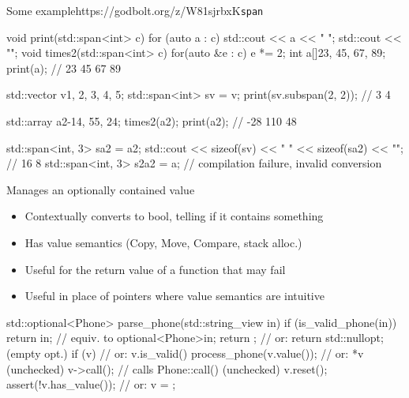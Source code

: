 \begin{frame}[fragile]
  \begin{exampleblockGB}{Some example}{https://godbolt.org/z/W81sjrbxK}{\texttt{span}}
    \scriptsize
    \begin{cppcode*}{}
      void print(std::span<int> c) {
        for (auto a : c) { std::cout << a << " "; }
        std::cout << "\n";
      }
      void times2(std::span<int> c) {
        for(auto &e : c) { e *= 2; }
      }
      int a[]{23, 45, 67, 89};
      print(a);                 // 23 45 67 89

      std::vector v{1, 2, 3, 4, 5};
      std::span<int> sv = v;
      print(sv.subspan(2, 2));  // 3 4

      std::array a2{-14, 55, 24};
      times2(a2);
      print(a2);                // -28 110 48

      std::span<int, 3> sa2 = a2;
      std::cout << sizeof(sv) << " " << sizeof(sa2) << "\n";  // 16 8
      std::span<int, 3> s2a2 = a; // compilation failure, invalid conversion
    \end{cppcode*}
  \end{exampleblockGB}
\end{frame}

\begin{frame}[fragile]
  \begin{block}{Manages an optionally contained value}
    \begin{itemize}
    \item Contextually converts to bool, telling if it contains something
    \item Has value semantics (Copy, Move, Compare, stack alloc.)
    \item Useful for the return value of a function that may fail
    \item Useful in place of pointers where value semantics are intuitive
    \end{itemize}
  \end{block}
  \begin{exampleblock}{}
    \small
    \begin{cppcode*}{}
      std::optional<Phone> parse_phone(std::string_view in) {
        if (is_valid_phone(in))
          return in;   // equiv. to optional<Phone>{in};
        return {};   // or: return std::nullopt; (empty opt.)
      }
      if (v) {                    // or: v.is_valid()
        process_phone(v.value()); // or: *v (unchecked)
        v->call(); // calls Phone::call()   (unchecked)
      }
      v.reset(); assert(!v.has_value()); // or: v = {};
    \end{cppcode*}
  \end{exampleblock}
\end{frame}

